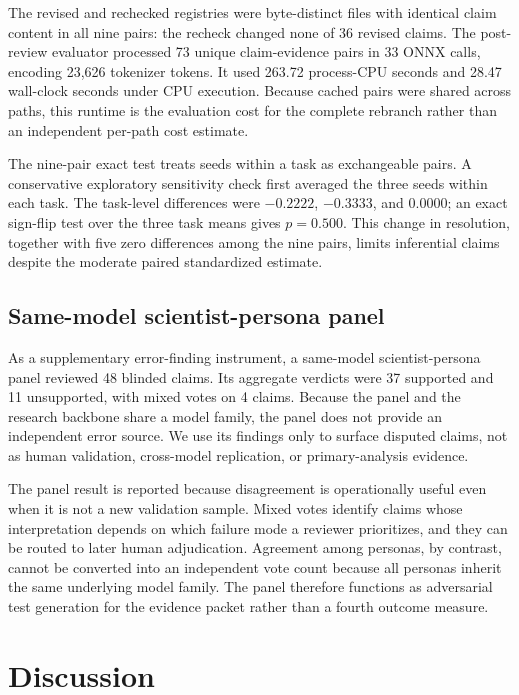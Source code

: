 \documentclass[11pt]{article}
\begin{document}
The revised and rechecked registries were byte-distinct files with identical claim content in all nine pairs: the recheck changed none of 36 revised claims. The post-review evaluator processed 73 unique claim-evidence pairs in 33 ONNX calls, encoding 23,626 tokenizer tokens. It used 263.72 process-CPU seconds and 28.47 wall-clock seconds under CPU execution. Because cached pairs were shared across paths, this runtime is the evaluation cost for the complete rebranch rather than an independent per-path cost estimate.

The nine-pair exact test treats seeds within a task as exchangeable pairs. A conservative exploratory sensitivity check first averaged the three seeds within each task. The task-level differences were $-0.2222$, $-0.3333$, and $0.0000$; an exact sign-flip test over the three task means gives $p=0.500$. This change in resolution, together with five zero differences among the nine pairs, limits inferential claims despite the moderate paired standardized estimate.

\subsection{Same-model scientist-persona panel}

As a supplementary error-finding instrument, a same-model scientist-persona panel reviewed 48 blinded claims. Its aggregate verdicts were 37 supported and 11 unsupported, with mixed votes on 4 claims. Because the panel and the research backbone share a model family, the panel does not provide an independent error source. We use its findings only to surface disputed claims, not as human validation, cross-model replication, or primary-analysis evidence.

The panel result is reported because disagreement is operationally useful even when it is not a new validation sample. Mixed votes identify claims whose interpretation depends on which failure mode a reviewer prioritizes, and they can be routed to later human adjudication. Agreement among personas, by contrast, cannot be converted into an independent vote count because all personas inherit the same underlying model family. The panel therefore functions as adversarial test generation for the evidence packet rather than a fourth outcome measure.

\section{Discussion}
\end{document}
